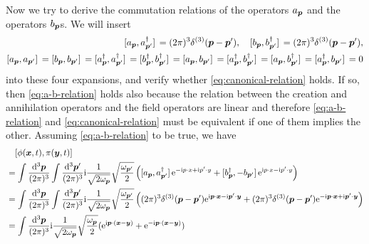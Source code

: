 \documentclass[hyperref, a4paper]{article}
\newcommand*{\ii}{\mathrm{i}}
\newcommand*{\ee}{\mathrm{e}}
\begin{document}
\begin{itemize}
    Now we try to derive the commutation relations of the operators $a_{\vb*{p}}$ and the operators $b_{\vb*{p}}$s.
    We will insert 
    \begin{equation}
        \begin{aligned}
            \comm*{a_{\vb*{p}}}{a^\dagger_{\vb*{p}'}} = (2\pi)^3 \delta^{(3)}(\vb*{p} - \vb*{p}'), \quad \comm*{b_{\vb*{p}}}{b^\dagger_{\vb*{p}'}} = (2\pi)^3 \delta^{(3)}(\vb*{p} - \vb*{p}') , \\
            \comm*{a_{\vb*{p}}}{a_{\vb*{p}'}} = \comm*{b_{\vb*{p}}}{b_{\vb*{p}'}} = \comm*{a^\dagger_{\vb*{p}}}{a^\dagger_{\vb*{p}'}} = \comm*{b^\dagger_{\vb*{p}}}{b^\dagger_{\vb*{p}'}} = \comm*{a_{\vb*{p}}}{b_{\vb*{p}'}}  = \comm*{a^\dagger_{\vb*{p}}}{b^\dagger_{\vb*{p}'}} = \comm*{a_{\vb*{p}}}{b^\dagger_{\vb*{p}'}} = \comm*{a_{\vb*{p}}^\dagger}{b_{\vb*{p}'}} = 0 
        \end{aligned}
        \label{eq:a-b-relation}
    \end{equation}
    into these four expansions, and verify whether \eqref{eq:canonical-relation} holds.
    If so, then \eqref{eq:a-b-relation} holds also because the relation between the creation and annihilation operators and the field operators are linear and therefore \eqref{eq:a-b-relation} and \eqref{eq:canonical-relation} must be equivalent if one of them implies the other.
    Assuming \eqref{eq:a-b-relation} to be true, we have 
    \[
        \begin{aligned}
            &\quad \comm*{\phi(\vb*{x}, t)}{\pi(\vb*{y}, t)} \\
            &= \int \frac{\dd[3]{\vb*{p}}}{(2\pi)^3} \int \frac{\dd[3]{\vb*{p}'}}{(2\pi)^3} \ii \frac{1}{\sqrt{2 \omega_{\vb*{p}}}} \sqrt{\frac{\omega_{\vb*{p}'}}{2}} \left( \comm*{a_{\vb*{p}}}{ a^\dagger_{\vb*{p}'}} \ee^{- \ii p \cdot x + \ii p' \cdot y} + \comm*{b^\dagger_{\vb*{p}}}{- b_{\vb*{p}'}} \ee^{\ii p \cdot x - \ii p' \cdot y} \right) \\
            &= \int \frac{\dd[3]{\vb*{p}}}{(2\pi)^3} \int \frac{\dd[3]{\vb*{p}'}}{(2\pi)^3} \ii \frac{1}{\sqrt{2 \omega_{\vb*{p}}}} \sqrt{\frac{\omega_{\vb*{p}'}}{2}} \left( (2\pi)^3 \delta^{(3)}(\vb*{p} - \vb*{p}') \ee^{\ii \vb*{p} \cdot \vb*{x} - \ii \vb*{p}' \cdot \vb*{y}} + (2\pi)^3 \delta^{(3)}(\vb*{p} - \vb*{p}') \ee^{- \ii \vb*{p} \cdot \vb*{x} + \ii \vb*{p}' \cdot \vb*{y}} \right) \\
            &= \int \frac{\dd[3]{\vb*{p}}}{(2\pi)^3} \ii \frac{1}{\sqrt{2\omega_{\vb*{p}}}} \sqrt{\frac{\omega_{\vb*{p}}}{2}} (\ee^{\ii \vb*{p} \cdot (\vb*{x} - \vb*{y})} + \ee^{- \ii \vb*{p} \cdot (\vb*{x} - \vb*{y})}) \\

\end{aligned}\]
\end{itemize}
\end{document}
